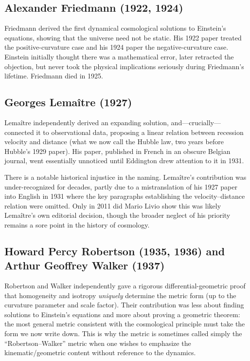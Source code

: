 \subsection*{Alexander Friedmann (1922, 1924)}

Friedmann derived the first dynamical cosmological solutions to Einstein's equations, showing that the universe need not be static. His 1922 paper treated the positive-curvature case and his 1924 paper the negative-curvature case. Einstein initially thought there was a mathematical error, later retracted the objection, but never took the physical implications seriously during Friedmann's lifetime. Friedmann died in 1925.

\subsection*{Georges Lema\^{i}tre (1927)}

Lema\^{i}tre independently derived an expanding solution, and---crucially---connected it to observational data, proposing a linear relation between recession velocity and distance (what we now call the Hubble law, two years before Hubble's 1929 paper). His paper, published in French in an obscure Belgian journal, went essentially unnoticed until Eddington drew attention to it in 1931.

There is a notable historical injustice in the naming. Lema\^{i}tre's contribution was under-recognized for decades, partly due to a mistranslation of his 1927 paper into English in 1931 where the key paragraphs establishing the velocity--distance relation were omitted. Only in 2011 did Mario Livio show this was likely Lema\^{i}tre's own editorial decision, though the broader neglect of his priority remains a sore point in the history of cosmology.

\subsection*{Howard Percy Robertson (1935, 1936) and Arthur Geoffrey Walker (1937)}

Robertson and Walker independently gave a rigorous differential-geometric proof that homogeneity and isotropy \emph{uniquely} determine the metric form (up to the curvature parameter and scale factor). Their contribution was less about finding solutions to Einstein's equations and more about proving a geometric theorem: the most general metric consistent with the cosmological principle must take the form we now write down. This is why the metric is sometimes called simply the ``Robertson--Walker'' metric when one wishes to emphasize the kinematic/geometric content without reference to the dynamics.

